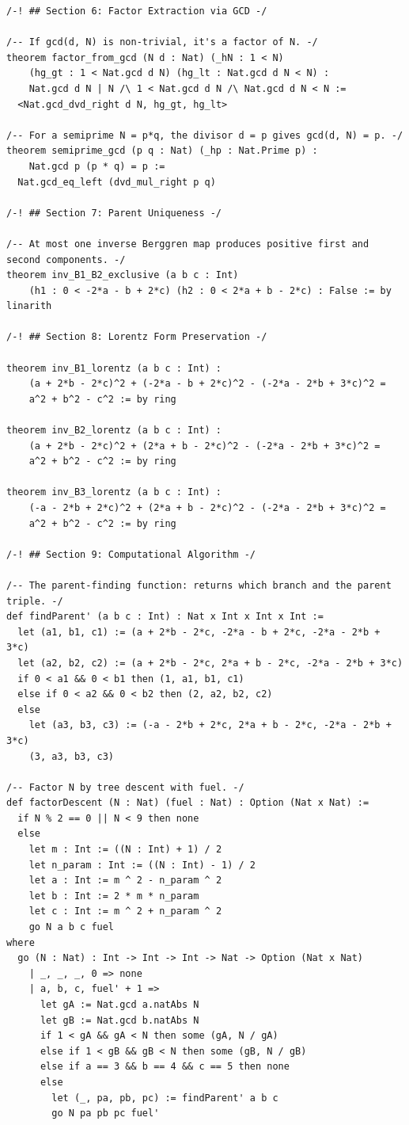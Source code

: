 \documentclass[11pt,twoside,openright]{book}
\theoremstyle{definition}
\theoremstyle{remark}
\begin{document}
\begin{lstlisting}[style=lean]
/-! ## Section 6: Factor Extraction via GCD -/

/-- If gcd(d, N) is non-trivial, it's a factor of N. -/
theorem factor_from_gcd (N d : Nat) (_hN : 1 < N)
    (hg_gt : 1 < Nat.gcd d N) (hg_lt : Nat.gcd d N < N) :
    Nat.gcd d N | N /\ 1 < Nat.gcd d N /\ Nat.gcd d N < N :=
  <Nat.gcd_dvd_right d N, hg_gt, hg_lt>

/-- For a semiprime N = p*q, the divisor d = p gives gcd(d, N) = p. -/
theorem semiprime_gcd (p q : Nat) (_hp : Nat.Prime p) :
    Nat.gcd p (p * q) = p :=
  Nat.gcd_eq_left (dvd_mul_right p q)

/-! ## Section 7: Parent Uniqueness -/

/-- At most one inverse Berggren map produces positive first and second components. -/
theorem inv_B1_B2_exclusive (a b c : Int)
    (h1 : 0 < -2*a - b + 2*c) (h2 : 0 < 2*a + b - 2*c) : False := by linarith

/-! ## Section 8: Lorentz Form Preservation -/

theorem inv_B1_lorentz (a b c : Int) :
    (a + 2*b - 2*c)^2 + (-2*a - b + 2*c)^2 - (-2*a - 2*b + 3*c)^2 =
    a^2 + b^2 - c^2 := by ring

theorem inv_B2_lorentz (a b c : Int) :
    (a + 2*b - 2*c)^2 + (2*a + b - 2*c)^2 - (-2*a - 2*b + 3*c)^2 =
    a^2 + b^2 - c^2 := by ring

theorem inv_B3_lorentz (a b c : Int) :
    (-a - 2*b + 2*c)^2 + (2*a + b - 2*c)^2 - (-2*a - 2*b + 3*c)^2 =
    a^2 + b^2 - c^2 := by ring

/-! ## Section 9: Computational Algorithm -/

/-- The parent-finding function: returns which branch and the parent triple. -/
def findParent' (a b c : Int) : Nat x Int x Int x Int :=
  let (a1, b1, c1) := (a + 2*b - 2*c, -2*a - b + 2*c, -2*a - 2*b + 3*c)
  let (a2, b2, c2) := (a + 2*b - 2*c, 2*a + b - 2*c, -2*a - 2*b + 3*c)
  if 0 < a1 && 0 < b1 then (1, a1, b1, c1)
  else if 0 < a2 && 0 < b2 then (2, a2, b2, c2)
  else
    let (a3, b3, c3) := (-a - 2*b + 2*c, 2*a + b - 2*c, -2*a - 2*b + 3*c)
    (3, a3, b3, c3)

/-- Factor N by tree descent with fuel. -/
def factorDescent (N : Nat) (fuel : Nat) : Option (Nat x Nat) :=
  if N % 2 == 0 || N < 9 then none
  else
    let m : Int := ((N : Int) + 1) / 2
    let n_param : Int := ((N : Int) - 1) / 2
    let a : Int := m ^ 2 - n_param ^ 2
    let b : Int := 2 * m * n_param
    let c : Int := m ^ 2 + n_param ^ 2
    go N a b c fuel
where
  go (N : Nat) : Int -> Int -> Int -> Nat -> Option (Nat x Nat)
    | _, _, _, 0 => none
    | a, b, c, fuel' + 1 =>
      let gA := Nat.gcd a.natAbs N
      let gB := Nat.gcd b.natAbs N
      if 1 < gA && gA < N then some (gA, N / gA)
      else if 1 < gB && gB < N then some (gB, N / gB)
      else if a == 3 && b == 4 && c == 5 then none
      else
        let (_, pa, pb, pc) := findParent' a b c
        go N pa pb pc fuel'


\end{lstlisting}
\end{document}
